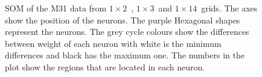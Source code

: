         \begin{figure}
            \hfill
             \hfill
            \caption{SOM of the M31 data from $1\times2$~, $1\times3$~and $1\times14$~grids. The axes show the position of the neurons. The purple Hexagonal shapes represent the neurons. The grey cycle colours show the differences between weight of each neuron with white is the minimum differences and black has the maximum one. The numbers in the plot show the regions that are located in each neuron.}
            \label{fig: M31_nets_1d}
        \end{figure}
        
